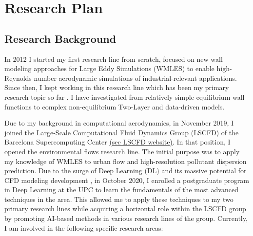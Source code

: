 \documentclass{article}
\begin{document}
\vspace{0.5cm}

\section{Research Plan} 

\subsection{Research Background} 

In 2012 I started my first research line from scratch, focused on new wall modeling approaches for Large Eddy Simulations (WMLES) to enable high-Reynolds number aerodynamic simulations of industrial-relevant applications. Since then, I kept working in this research line which has been my primary research topic so far \cite{CAL19,ALJ18}. I have investigated from relatively simple equilibrium wall functions to complex non-equilibrium Two-Layer and data-driven models. 

Due to my background in computational aerodynamics, in November 2019, I joined the Large-Scale Computational Fluid Dynamics Group (LSCFD) of the Barcelona Supercomputing Center  \href{https://www.bsc.es/discover-bsc/organisation/research-departments/large-scale-computational-fluid-dynamics}{(see LSCFD website)}. In that position, I opened the environmental flows research line. The initial purpose was to apply my knowledge of WMLES to urban flow and high-resolution pollutant dispersion prediction.
Due to the surge of Deep Learning (DL) and its massive potential for CFD modeling development \cite{KUT17}, in October 2020, I enrolled a postgraduate program in Deep Learning at the UPC to learn the fundamentals of the most advanced techniques in the area. This allowed me to apply these techniques to my two primary research lines while acquiring a horizontal role within the LSCFD group by promoting AI-based methods in various research lines of the group. Currently, I am involved in the following specific research areas:
\end{document}
